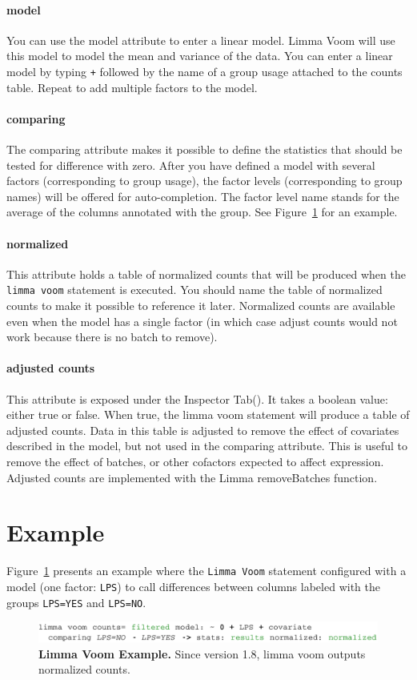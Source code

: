 \paragraph{model}
You can use the model attribute to enter a linear model. Limma Voom will use this model to model the mean and variance of the data. You can enter a linear model by typing \texttt{+} followed by the name of a group usage attached to the counts table. Repeat to add multiple factors to the model. 

\paragraph{comparing}
The comparing attribute makes it possible to define the statistics that should be tested for difference with zero. After you have defined a model with several factors (corresponding to group usage), the factor levels (corresponding to group names) will be offered for auto-completion. The factor level name stands for the average of the columns annotated with the group. See Figure~\ref{fig:LimmaVoomExample} for an example. 

\paragraph{normalized}
This attribute holds a table of normalized counts that will be produced when the \texttt{limma voom} statement is executed. You should name the table of normalized counts to make it possible to reference it later. Normalized counts are available even when the model has a single factor (in which case adjust counts would not work because there is no batch to remove).

\paragraph{adjusted counts}
This attribute is exposed under the Inspector Tab(\inspectorTabIcon). It takes a boolean value: either true or false. When true, the limma voom statement will produce a table of adjusted counts. Data in this table is adjusted to remove the effect of covariates described in the model, but not used in the comparing attribute. This is useful to remove the effect of batches, or other cofactors expected to affect expression. Adjusted counts are implemented with the Limma removeBatches function.   
 
\section{Example}
Figure~\ref{fig:LimmaVoomExample} presents an example where the \texttt{Limma Voom} statement configured with a model (one factor: \texttt{LPS}) to call differences between columns labeled with the groups \texttt{LPS=YES} and \texttt{LPS=NO}.



\begin{figure}[h!tbp]
  \centering
  \includegraphics[width=\figWidthWide]{figures/LimmaVoomExample.pdf}
\caption[Limma Voom Example.]{\textbf{Limma Voom Example.}  Since version 1.8, limma voom outputs normalized counts.}
\label{fig:LimmaVoomExample}
\end{figure}

